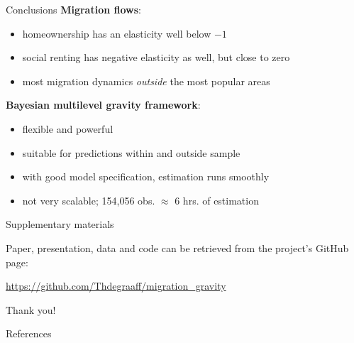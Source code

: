 \documentclass{beamer}
\begin{document}
\begin{frame}{Conclusions}
\textbf{Migration flows}:
\begin{itemize}
	\item homeownership has an \alert{elasticity} well below $-1$
	\item social renting has negative elasticity as well, but close to \alert{zero} \citep{boyle1998migration}
	\item most migration dynamics \emph{outside} the most popular areas 
\end{itemize}

\textbf{Bayesian multilevel gravity framework}:
\begin{itemize}
	\item \alert{flexible} and \alert{powerful}
	\item suitable for predictions \alert{within} and \alert{outside} sample
	\item with good model specification, estimation runs smoothly
	\item not very \alert{scalable}; 154,056 obs. $\approx$ 6 hrs. of estimation
\end{itemize}
\end{frame}

\begin{frame}{Supplementary materials}

Paper, presentation, data and code can be retrieved from the project's GitHub page: 

\begin{center}\url{https://github.com/Thdegraaff/migration\_gravity}\end{center}

\end{frame}

\begin{frame}[standout]
Thank you!
\end{frame}

\appendix

\begin{frame}[allowframebreaks]{References}

		\printbibliography[heading=none]

\end{frame}
\end{document}
